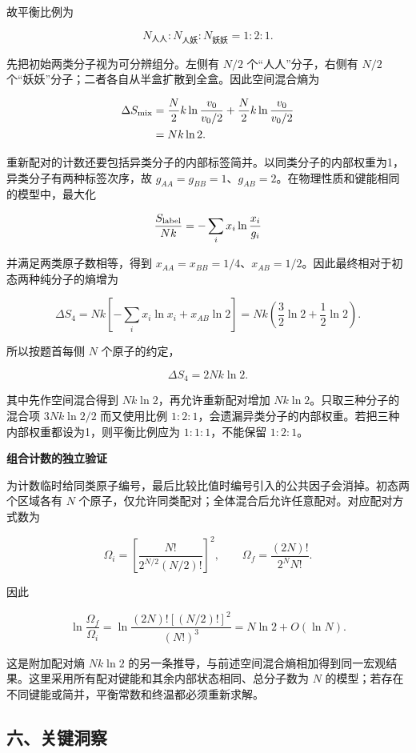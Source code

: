 \documentclass[12pt,a4paper,UTF8]{ctexart}
\begin{document}
故平衡比例为

\[\boxed{N_{\text{人人}}:N_{\text{人妖}}:N_{\text{妖妖}}=1:2:1}.\]

先把初始两类分子视为可分辨组分。左侧有 \(N/2\) 个``人人''分子，右侧有
\(N/2\) 个``妖妖''分子；二者各自从半盒扩散到全盒。因此空间混合熵为

\[
\begin{aligned}
\Delta S_{\rm mix}
&=\frac N2k\ln\frac{v_0}{v_0/2}
+\frac N2k\ln\frac{v_0}{v_0/2}\\
&=Nk\ln2.
\end{aligned}
\]

重新配对的计数还要包括异类分子的内部标签简并。以同类分子的内部权重为1，异类分子有两种标签次序，故
\(g_{AA}=g_{BB}=1\)、\(g_{AB}=2\)。在物理性质和键能相同的模型中，最大化

\[\frac{S_{\rm label}}{Nk}
=-\sum_i x_i\ln\frac{x_i}{g_i}\]

并满足两类原子数相等，得到
\(x_{AA}=x_{BB}=1/4\)、\(x_{AB}=1/2\)。因此最终相对于初态两种纯分子的熵增为

\[\Delta S_4=Nk\left[-\sum_i x_i\ln x_i+x_{AB}\ln2\right]
=Nk\left(\frac32\ln2+\frac12\ln2\right).\]

所以按题首每侧 \(N\) 个原子的约定，

\[\boxed{\Delta S_4=2Nk\ln2.}\]

其中先作空间混合得到 \(Nk\ln2\)，再允许重新配对增加
\(Nk\ln2\)。只取三种分子的混合项 \(3Nk\ln2/2\) 而又使用比例
\(1:2:1\)，会遗漏异类分子的内部权重。若把三种内部权重都设为1，则平衡比例应为
\(1:1:1\)，不能保留 \(1:2:1\)。

\textbf{组合计数的独立验证}

为计数临时给同类原子编号，最后比较比值时编号引入的公共因子会消掉。初态两个区域各有
\(N\) 个原子，仅允许同类配对；全体混合后允许任意配对。对应配对方式数为

\[\Omega_i=\left[\frac{N!}{2^{N/2}(N/2)!}\right]^2,
\qquad
\Omega_f=\frac{(2N)!}{2^NN!}.\]

因此

\[\ln\frac{\Omega_f}{\Omega_i}
=\ln\frac{(2N)![(N/2)!]^2}{(N!)^3}
=N\ln2+O(\ln N).\]

这是附加配对熵 \(Nk\ln2\)
的另一条推导，与前述空间混合熵相加得到同一宏观结果。这里采用所有配对键能和其余内部状态相同、总分子数为
\(N\) 的模型；若存在不同键能或简并，平衡常数和终温都必须重新求解。

\subsection{六、关键洞察}\label{ux516dux5173ux952eux6d1eux5bdf-5}
\end{document}
